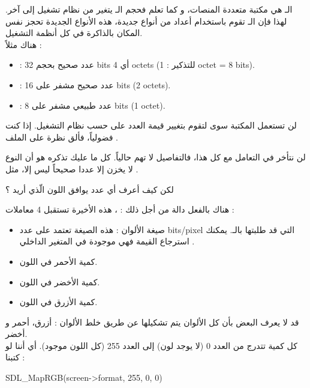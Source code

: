 الـ
هي مكتبة متعددة المنصات، و كما تعلم فحجم الـ
يتغير من نظام تشغيل إلى آخر. لهذا فإن الـ
تقوم باستخدام أعداد من أنواع جديدة، هذه الأنواع الجديدة تحجز نفس المكان بالذاكرة في كل أنظمة التشغيل.\\

هناك مثلاً :

\begin{itemize}
	\item {} :
عدد صحيح بحجم
\textenglish{32 bits}
أي
\textenglish{4 octets}
(للتذكير :
\textenglish{1 octet = 8 bits}).
	\item {} :
عدد صحيح مشفر على
\textenglish{16 bits} (\textenglish{2 octets}).
	\item {} :
عدد طبيعي مشفر على
\textenglish{8 bits} (\textenglish{1 octet}).
\end{itemize}
لن تستعمل المكتبة سوى
لتقوم بتغيير قيمة العدد على حسب نظام التشغيل. إذا كنت فضولياً، فألق نظرة على الملف
.

لن نتأخر في التعامل مع كل هذا، فالتفاصيل لا تهم حالياً. كل ما عليك تذكره هو أن النوع
لا يخزن إلا عددا صحيحاً ليس إلا، مثل
.

\begin{question}
لكن كيف أعرف أي عدد يوافق اللون الّذي أريد ؟
\end{question}

هناك بالفعل دالة من أجل ذلك :
،
هذه الأخيرة تستقبل 4 معاملات :

\begin{itemize}
	\item صيغة الألوان : هذه الصيغة تعتمد على عدد
	\textenglish{bits/pixel}
	التي قد طلبتها بالـ.
	يمكنك استرجاع القيمة فهي موجودة في المتغير الداخلي
	.
	\item كمية الأحمر في اللون.
	\item كمية الأخضر في اللون.
	\item كمية الأزرق في اللون.
\end{itemize}

قد لا يعرف البعض بأن كل الألوان يتم تشكيلها عن طريق خلط الألوان : أزرق، أحمر و أخضر.\\
كل كمية تتدرج من العدد 0 (لا يوجد لون) إلى العدد 255 (كل اللون موجود). أي أننا لو كتبنا :

\begin{Csource}
SDL_MapRGB(screen->format, 255, 0, 0)
\end{Csource}

